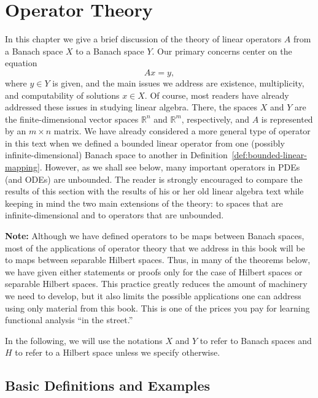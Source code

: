 \section{Operator Theory}\label{chap:operator-theory}

In this chapter we give a brief discussion of the theory of linear operators $A$ from a Banach space $X$ to a Banach space $Y$. Our primary concerns center on the equation
\begin{equation}\label{eq:abstract-linear-operator-equation}
Ax=y,
\end{equation}
where $y\in Y$ is given, and the main issues we address are existence, multiplicity, and computability of solutions $x\in X$. Of course, most readers have already addressed these issues in studying linear algebra. There, the spaces $X$ and $Y$ are the finite-dimensional vector spaces $\mathbb{R}^n$ and $\mathbb{R}^m$, respectively, and $A$ is represented by an $m\times n$ matrix. We have already considered a more general type of operator in this text when we defined a bounded linear operator from one (possibly infinite-dimensional) Banach space to another in Definition~\ref{def:bounded-linear-mapping}. However, as we shall see below, many important operators in PDEs (and ODEs) are unbounded. The reader is strongly encouraged to compare the results of this section with the results of his or her old linear algebra text while keeping in mind the two main extensions of the theory: to spaces that are infinite-dimensional and to operators that are unbounded.

\textbf{Note:} Although we have defined operators to be maps between Banach spaces, most of the applications of operator theory that we address in this book will be to maps between separable Hilbert spaces. Thus, in many of the theorems below, we have given either statements or proofs only for the case of Hilbert spaces or separable Hilbert spaces. This practice greatly reduces the amount of machinery we need to develop, but it also limits the possible applications one can address using only material from this book. This is one of the prices you pay for learning functional analysis ``in the street.''

In the following, we will use the notations $X$ and $Y$ to refer to Banach spaces and $H$ to refer to a Hilbert space unless we specify otherwise.

\subsection{Basic Definitions and Examples}\label{sec:operator-basic-definitions-examples}

